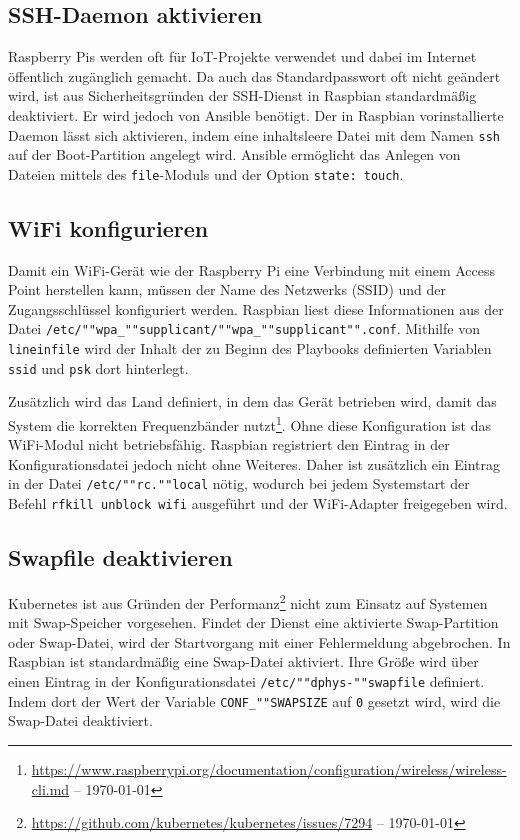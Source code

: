 \subsection{SSH-Daemon aktivieren}\label{subsec:ssh-daemon-aktivieren}

Raspberry Pis werden oft für IoT-Projekte verwendet und dabei im Internet öffentlich zugänglich gemacht.
Da auch das Standardpasswort oft nicht geändert wird, ist aus Sicherheitsgründen der SSH-Dienst in Raspbian standardmäßig deaktiviert.
Er wird jedoch von Ansible benötigt.
Der in Raspbian vorinstallierte Daemon lässt sich aktivieren, indem eine inhaltsleere Datei mit dem Namen \texttt{ssh} auf der Boot-Partition angelegt wird.
Ansible ermöglicht das Anlegen von Dateien mittels des \texttt{file}-Moduls und der Option \texttt{state: touch}.

\subsection{WiFi konfigurieren}\label{subsec:wifi-konfigurieren}

Damit ein WiFi-Gerät wie der Raspberry Pi eine Verbindung mit einem Access Point herstellen kann, müssen der Name des Netzwerks (SSID) und der Zugangsschlüssel konfiguriert werden.
Raspbian liest diese Informationen aus der Datei \texttt{/etc/""wpa\_""supplicant/""wpa\_""supplicant"".conf}.
Mithilfe von \texttt{lineinfile} wird der Inhalt der zu Beginn des Playbooks definierten Variablen \texttt{ssid} und \texttt{psk} dort hinterlegt.

Zusätzlich wird das Land definiert, in dem das Gerät betrieben wird, damit das System die korrekten Frequenzbänder nutzt\footnote{\url{https://www.raspberrypi.org/documentation/configuration/wireless/wireless-cli.md} -- \today}.
Ohne diese Konfiguration ist das WiFi-Modul nicht betriebsfähig.
Raspbian registriert den Eintrag in der Konfigurationsdatei jedoch nicht ohne Weiteres.
Daher ist zusätzlich ein Eintrag in der Datei \texttt{/etc/""rc.""local} nötig, wodurch bei jedem Systemstart der Befehl \texttt{rfkill unblock wifi} ausgeführt und der WiFi-Adapter freigegeben wird.

\subsection{Swapfile deaktivieren}\label{subsec:swapfile-deaktivieren}

Kubernetes ist aus Gründen der Performanz\footnote{\url{https://github.com/kubernetes/kubernetes/issues/7294} -- \today} nicht zum Einsatz auf Systemen mit Swap-Speicher vorgesehen.
Findet der Dienst eine aktivierte Swap-Partition oder Swap-Datei, wird der Startvorgang mit einer Fehlermeldung abgebrochen.
In Raspbian ist standardmäßig eine Swap-Datei aktiviert.
Ihre Größe wird über einen Eintrag in der Konfigurationsdatei \texttt{/etc/""dphys-""swapfile} definiert.
Indem dort der Wert der Variable \texttt{CONF\_""SWAPSIZE} auf \texttt{0} gesetzt wird, wird die Swap-Datei deaktiviert.

